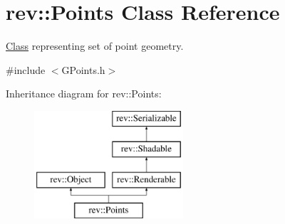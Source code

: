 \hypertarget{classrev_1_1_points}{}\section{rev\+::Points Class Reference}
\label{classrev_1_1_points}


\mbox{\hyperlink{struct_class}{Class}} representing set of point geometry.  




{\ttfamily \#include $<$G\+Points.\+h$>$}

Inheritance diagram for rev\+::Points\+:\begin{figure}[H]
\begin{center}
\leavevmode
\includegraphics[height=4.000000cm]{classrev_1_1_points}
\end{center}
\end{figure}
